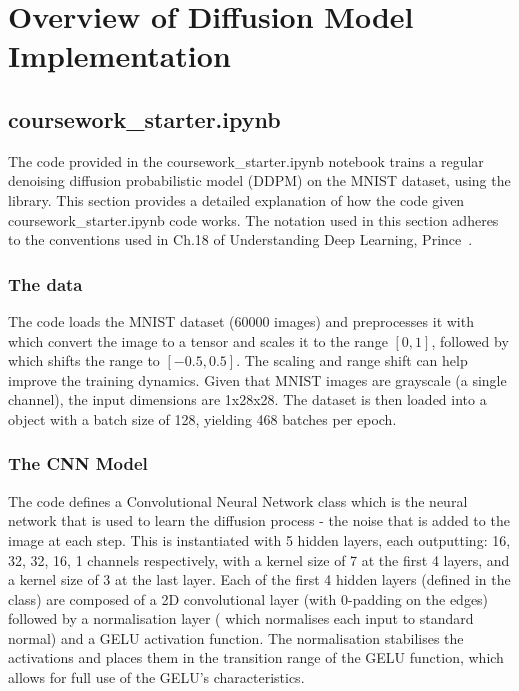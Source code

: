 
\section{Overview of Diffusion Model Implementation}\label{sec:q1a}
\subsection{coursework\_starter.ipynb}\label{subsec:q1a}
The code provided in the coursework\_starter.ipynb notebook trains a regular denoising diffusion probabilistic model
(DDPM) on the MNIST dataset, using the  library.
This section provides a detailed explanation of how the code given coursework\_starter.ipynb code works.
The notation used in this section adheres to the conventions used in Ch.18 of Understanding Deep Learning, Prince~\cite{prince}.

\subsubsection{The data}\label{subsubsec:data}
The code loads the MNIST dataset (60000 images) and preprocesses it with  which convert
the image to a tensor and scales it to the range $[0, 1]$, followed by 
which shifts the range to $[-0.5, 0.5]$.
The scaling and range shift can help improve the training dynamics.
Given that MNIST images are grayscale (a single channel), the input dimensions are 1x28x28.
The dataset is then loaded into a  object with a batch size of 128, yielding 468 batches per
epoch.

\subsubsection{The CNN Model}\label{subsubsec:cnn-model}
The code defines a Convolutional Neural Network  class which is the neural network that is used to
learn the diffusion process - the noise that is added to the image at each step.
This is instantiated with 5 hidden layers, each outputting: 16, 32, 32, 16, 1 channels respectively, with a kernel size
of 7 at the first 4 layers, and a kernel size of 3 at the last layer.
Each of the first 4 hidden layers (defined in the  class) are composed of a 2D convolutional layer
(with 0-padding on the edges) followed by a normalisation layer ( which normalises each input to
standard normal) and a GELU activation function.
The normalisation stabilises the activations and places them in the transition range of the GELU function, which allows
for full use of the GELU's characteristics.

